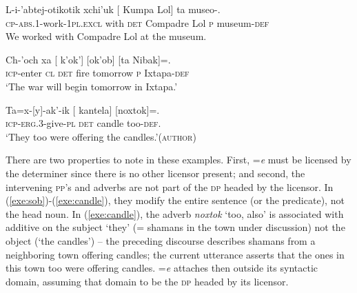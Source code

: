 \documentclass[output=paper,
modfonts
]{LSP/langsci}
\begin{document}
		\begin{exe}
		\ex\label{exe:sob}\bridgeoverex
		\gll L-i-'abtej-otikotik xchi'uk [ Kumpa Lol] ta museo-. \\
		\textsc{cp-abs.1}-work-\textsc{1pl.excl} with \textsc{det} Compadre Lol \textsc{p} museum-\textsc{def} \\
		\glt We worked with Compadre Lol at the museum. \citep[25]{laughlin1980} 
		\end{exe}
		\begin{exe}
		\ex\label{exe:vov}\bridgeoverex
		\gll Ch-'och xa [ k'ok'] [ok'ob] [ta Nibak]=\tikzmarkfullnamed{q}{{e}}. \\
		\textsc{icp}-enter \textsc{cl} \textsc{det} fire tomorrow \textsc{p} Ixtapa-\textsc{def} \\
		\glt `The war will begin tomorrow in Ixtapa.'  \citep[119]{laughlin1977} 
		\bridgeover{p}{q}
		\end{exe}
		\begin{exe}
		\ex\label{exe:candle}\bridgeoverex
		\gll Ta=x-[y]-ak'-ik [ kantela] [noxtok]=\tikzmarkfullnamed{j}{e}. \\
		\textsc{icp-erg.3}-give-\textsc{pl} \textsc{det} candle too-\textsc{def}. \\
		\glt `They too were offering the candles.'(\textsc{author})
		\bridgeover{i}{j}
		\end{exe}
There are two properties to note in these examples. First, =\emph{e} must be licensed by the determiner since there is no other licensor present; and second, the intervening \textsc{pp}'s and adverbs are not part of the \textsc{dp} headed by the licensor. In (\ref{exe:sob})-(\ref{exe:candle}), they modify the entire sentence (or the predicate), not the head noun. In (\ref{exe:candle}), the adverb \emph{noxtok} `too, also' is associated with additive  on the subject `they' (= shamans in the town under discussion) not the object (`the candles')  --  the preceding discourse describes shamans from a neighboring town offering candles; the current utterance asserts that the ones in this town too were offering candles. 
  =\emph{e} attaches then outside its syntactic domain, assuming that domain to be the \textsc{dp} headed by its licensor. 
 
\end{document}
